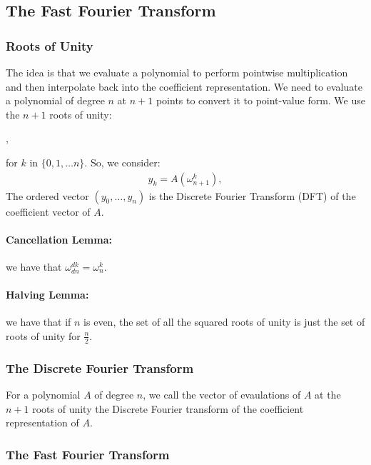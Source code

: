\subsection{The Fast Fourier Transform}

\subsubsection{Roots of Unity}

The idea is that we evaluate a polynomial to perform pointwise
multiplication and then interpolate back into the coefficient representation.
We need to evaluate a polynomial of degree $n$ at $n + 1$ points to
convert it to point-value form. We use the $n + 1$ roots of unity:
\begin{center}
    ,
\end{center} for $k$ in $\{0, 1, \ldots n\}$. So, we consider:
\begin{gather*}
  y_k = A(\omega_{n + 1}^k),
\end{gather*}
The ordered vector $(y_0, \ldots, y_n)$ is the 
Discrete Fourier Transform (DFT) of the coefficient vector of $A$.

\paragraph{Cancellation Lemma:} we have that 
$\omega_{dn}^{dk} = \omega_{n}^{k}$.

\paragraph{Halving Lemma:} we have that if $n$ is even, the set of all
the squared roots of unity is just the set of roots of unity for $\frac{n}{2}$.

\subsubsection{The Discrete Fourier Transform}

For a polynomial $A$ of degree $n$, we call the vector
of evaulations of $A$ at the $n + 1$ roots of unity the
Discrete Fourier transform of the coefficient representation
of $A$.

\subsubsection{The Fast Fourier Transform}

